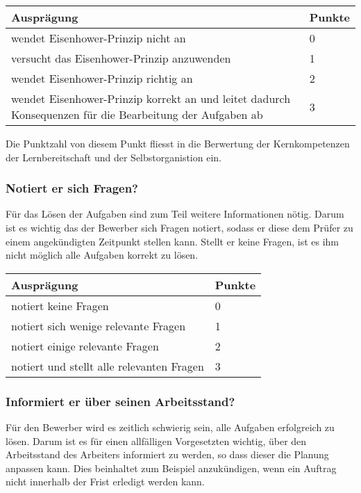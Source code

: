 \begin{center}
  \begin{tabular}{ | p{7cm} | p{1cm} |}
   \hline
   \textbf{Ausprägung} & \textbf{Punkte} \\ \hline
   wendet Eisenhower-Prinzip nicht an & 0 \\ \hline
   versucht das Eisenhower-Prinzip anzuwenden & 1 \\ \hline
   wendet Eisenhower-Prinzip richtig an & 2 \\ \hline
   wendet Eisenhower-Prinzip korrekt an und leitet dadurch Konsequenzen für die Bearbeitung der Aufgaben ab  & 3\\ \hline
  \end{tabular}
\end{center}

Die Punktzahl von diesem Punkt fliesst in die Berwertung der Kernkompetenzen der Lernbereitschaft und der Selbstorganistion ein.

\subsubsection{Notiert er sich Fragen?}
Für das Lösen der Aufgaben sind zum Teil weitere Informationen nötig. Darum ist es wichtig das der Bewerber sich Fragen notiert, sodass er diese dem Prüfer zu einem angekündigten Zeitpunkt stellen kann. Stellt er keine Fragen, ist es ihm nicht möglich alle Aufgaben korrekt zu lösen.


\begin{center}
  \begin{tabular}{ | p{7cm} | p{1cm} |}
   \hline
   \textbf{Ausprägung} & \textbf{Punkte} \\ \hline
   notiert keine Fragen & 0 \\ \hline
   notiert sich wenige relevante Fragen & 1 \\ \hline
   notiert einige relevante Fragen & 2 \\ \hline
   notiert und stellt alle relevanten Fragen  & 3\\ \hline
  \end{tabular}
\end{center}

\subsubsection{Informiert er über seinen Arbeitsstand?}
Für den Bewerber wird es zeitlich schwierig sein, alle Aufgaben erfolgreich zu lösen. Darum ist es für einen allfälligen Vorgesetzten wichtig, über den Arbeitsstand des Arbeiters informiert zu werden, so dass dieser die Planung anpassen kann. Dies beinhaltet zum Beispiel anzukündigen, wenn ein Auftrag nicht innerhalb der Frist erledigt werden kann.

